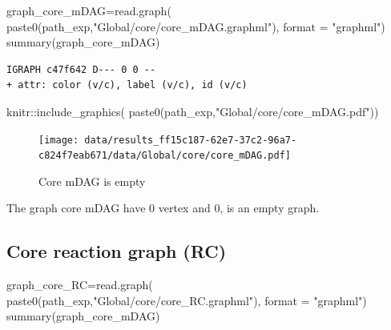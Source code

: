 \documentclass[
  letterpaper,
  DIV=11,
  numbers=noendperiod]{scrreprt}
\newenvironment{Shaded}{\begin{snugshade}}{\end{snugshade}}
\newcommand{\AttributeTok}[1]{\textcolor[rgb]{0.40,0.45,0.13}{#1}}
\newcommand{\FunctionTok}[1]{\textcolor[rgb]{0.28,0.35,0.67}{#1}}
\newcommand{\NormalTok}[1]{\textcolor[rgb]{0.00,0.23,0.31}{#1}}
\newcommand{\OtherTok}[1]{\textcolor[rgb]{0.00,0.23,0.31}{#1}}
\newcommand{\SpecialCharTok}[1]{\textcolor[rgb]{0.37,0.37,0.37}{#1}}
\newcommand{\StringTok}[1]{\textcolor[rgb]{0.13,0.47,0.30}{#1}}
\begin{document}
\begin{Shaded}
\begin{Highlighting}[]
\NormalTok{graph\_core\_mDAG}\OtherTok{=}\FunctionTok{read.graph}\NormalTok{(}
  \FunctionTok{paste0}\NormalTok{(path\_exp,}\StringTok{"Global/core/core\_mDAG.graphml"}\NormalTok{), }\AttributeTok{format =} \StringTok{"graphml"}\NormalTok{)}
\FunctionTok{summary}\NormalTok{(graph\_core\_mDAG)}
\end{Highlighting}
\end{Shaded}

\begin{verbatim}
IGRAPH c47f642 D--- 0 0 -- 
+ attr: color (v/c), label (v/c), id (v/c)
\end{verbatim}

\begin{Shaded}
\begin{Highlighting}[]
\NormalTok{knitr}\SpecialCharTok{::}\FunctionTok{include\_graphics}\NormalTok{(}
  \FunctionTok{paste0}\NormalTok{(path\_exp,}\StringTok{"Global/core/core\_mDAG.pdf"}\NormalTok{))}
\end{Highlighting}
\end{Shaded}

\begin{figure}[H]

{\centering \texttt{[image: data/results\_ff15c187-62e7-37c2-96a7-c824f7eab671/data/Global/core/core\_mDAG.pdf]}

}

\caption{Core mDAG is empty}

\end{figure}

The graph core mDAG have 0 vertex and 0, is an empty graph.

\hypertarget{core-reaction-graph-rc}{%
\subsection*{Core reaction graph (RC)}\label{core-reaction-graph-rc}}

\begin{Shaded}
\begin{Highlighting}[]
\NormalTok{graph\_core\_RC}\OtherTok{=}\FunctionTok{read.graph}\NormalTok{(}
  \FunctionTok{paste0}\NormalTok{(path\_exp,}\StringTok{"Global/core/core\_RC.graphml"}\NormalTok{), }\AttributeTok{format =} \StringTok{"graphml"}\NormalTok{)}
\FunctionTok{summary}\NormalTok{(graph\_core\_mDAG)}
\end{Highlighting}
\end{Shaded}
\end{document}

